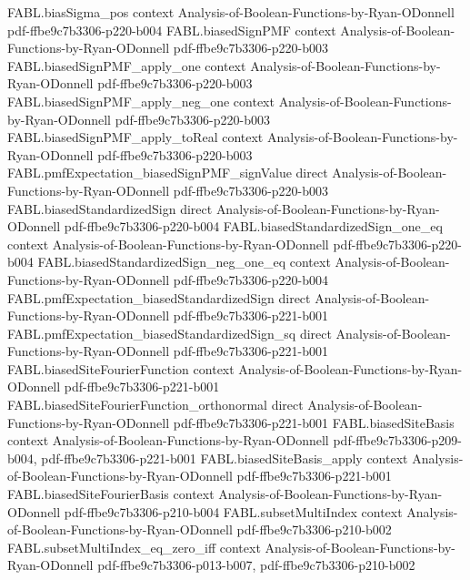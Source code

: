 \begin{theorem}
\proofstep
  {FABL.biasSigma_pos}
  {context}
  {Analysis-of-Boolean-Functions-by-Ryan-ODonnell}
  {pdf-ffbe9c7b3306-p220-b004}
\proofstep
  {FABL.biasedSignPMF}
  {context}
  {Analysis-of-Boolean-Functions-by-Ryan-ODonnell}
  {pdf-ffbe9c7b3306-p220-b003}
\proofstep
  {FABL.biasedSignPMF_apply_one}
  {context}
  {Analysis-of-Boolean-Functions-by-Ryan-ODonnell}
  {pdf-ffbe9c7b3306-p220-b003}
\proofstep
  {FABL.biasedSignPMF_apply_neg_one}
  {context}
  {Analysis-of-Boolean-Functions-by-Ryan-ODonnell}
  {pdf-ffbe9c7b3306-p220-b003}
\proofstep
  {FABL.biasedSignPMF_apply_toReal}
  {context}
  {Analysis-of-Boolean-Functions-by-Ryan-ODonnell}
  {pdf-ffbe9c7b3306-p220-b003}
\proofstep
  {FABL.pmfExpectation_biasedSignPMF_signValue}
  {direct}
  {Analysis-of-Boolean-Functions-by-Ryan-ODonnell}
  {pdf-ffbe9c7b3306-p220-b003}
\proofstep
  {FABL.biasedStandardizedSign}
  {direct}
  {Analysis-of-Boolean-Functions-by-Ryan-ODonnell}
  {pdf-ffbe9c7b3306-p220-b004}
\proofstep
  {FABL.biasedStandardizedSign_one_eq}
  {context}
  {Analysis-of-Boolean-Functions-by-Ryan-ODonnell}
  {pdf-ffbe9c7b3306-p220-b004}
\proofstep
  {FABL.biasedStandardizedSign_neg_one_eq}
  {context}
  {Analysis-of-Boolean-Functions-by-Ryan-ODonnell}
  {pdf-ffbe9c7b3306-p220-b004}
\proofstep
  {FABL.pmfExpectation_biasedStandardizedSign}
  {direct}
  {Analysis-of-Boolean-Functions-by-Ryan-ODonnell}
  {pdf-ffbe9c7b3306-p221-b001}
\proofstep
  {FABL.pmfExpectation_biasedStandardizedSign_sq}
  {direct}
  {Analysis-of-Boolean-Functions-by-Ryan-ODonnell}
  {pdf-ffbe9c7b3306-p221-b001}
\proofstep
  {FABL.biasedSiteFourierFunction}
  {context}
  {Analysis-of-Boolean-Functions-by-Ryan-ODonnell}
  {pdf-ffbe9c7b3306-p221-b001}
\proofstep
  {FABL.biasedSiteFourierFunction_orthonormal}
  {direct}
  {Analysis-of-Boolean-Functions-by-Ryan-ODonnell}
  {pdf-ffbe9c7b3306-p221-b001}
\proofstep
  {FABL.biasedSiteBasis}
  {context}
  {Analysis-of-Boolean-Functions-by-Ryan-ODonnell}
  {pdf-ffbe9c7b3306-p209-b004,
    pdf-ffbe9c7b3306-p221-b001}
\proofstep
  {FABL.biasedSiteBasis_apply}
  {context}
  {Analysis-of-Boolean-Functions-by-Ryan-ODonnell}
  {pdf-ffbe9c7b3306-p221-b001}
\proofstep
  {FABL.biasedSiteFourierBasis}
  {context}
  {Analysis-of-Boolean-Functions-by-Ryan-ODonnell}
  {pdf-ffbe9c7b3306-p210-b004}
\proofstep
  {FABL.subsetMultiIndex}
  {context}
  {Analysis-of-Boolean-Functions-by-Ryan-ODonnell}
  {pdf-ffbe9c7b3306-p210-b002}
\proofstep
  {FABL.subsetMultiIndex_eq_zero_iff}
  {context}
  {Analysis-of-Boolean-Functions-by-Ryan-ODonnell}
  {pdf-ffbe9c7b3306-p013-b007,
    pdf-ffbe9c7b3306-p210-b002}
\proofstep

\end{theorem}
